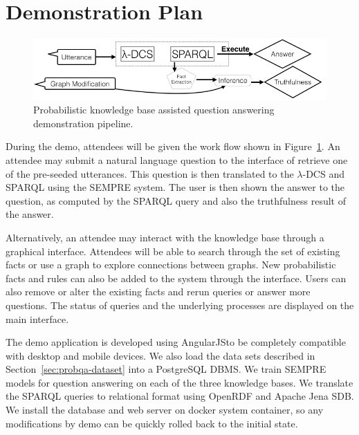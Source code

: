 
\section{Demonstration Plan}

\begin{figure}
\centering
 \includegraphics[width=0.9\linewidth]{images/probqa-pipeline.png}
 \caption{Probabilistic knowledge base assisted question answering demonstration pipeline.}
\label{fig:probqa-pipeline}
\end{figure}


During the demo, attendees will be given the work flow shown in Figure~\ref{fig:probqa-pipeline}.
An attendee may submit a natural language question to the interface of retrieve one of the pre-seeded utterances.
This question is then translated to the \(\lambda\)-DCS and SPARQL using the SEMPRE system.
The user is then shown the answer to the question, as computed by the SPARQL
query and also the truthfulness result of the answer.

Alternatively, an attendee may interact with the knowledge base through a graphical interface.
Attendees will be able to search through the set of existing facts or use a graph to explore connections between graphs.
New probabilistic facts and rules can also be added to the system through the interface.
Users can also remove or alter the existing facts and rerun queries or answer more questions.
The status of queries and the underlying processes are displayed on the main interface.









The demo application is developed using AngularJS\@ to be completely compatible with desktop and mobile devices.
We also load the data sets described in Section~\ref{sec:probqa-dataset} into a PostgreSQL DBMS\@.
We train SEMPRE models for question answering on each of the three knowledge bases.
We translate the SPARQL queries to relational format using OpenRDF and Apache Jena SDB\@.
We install the database and web server on docker system container, so any modifications by demo can be quickly rolled back to the initial state.






